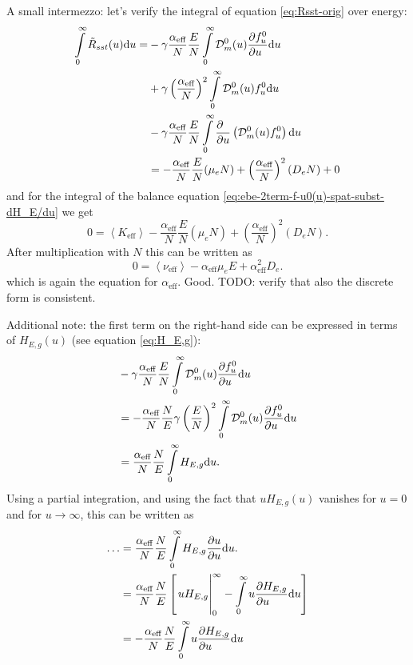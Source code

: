 \documentclass{book}
\newcommand{\MEAN}[1]{\ensuremath{\!\left\langle{{#1}}\right\rangle}}
\begin{document}
\begin{framed}
A small intermezzo: let's verify the integral of equation \eqref{eq:Rsst-orig} over energy:
\begin{align*}
	\int\limits_0^\infty \tilde{R}_{sst}(u)\dd{u}
	=
	& -\gamma\frac{\alpha_{\text{eff}}}{N}\frac{E}{N}\int\limits_0^\infty{\cal D}_m^0(u)\PDEV{f^0_u}{u}\dd{u} \\
	& +\gamma\left(\frac{\alpha_{\text{eff}}}{N}\right)^2\int\limits_0^\infty{\cal D}_m^0(u)f^0_u\dd{u} \\
	& -\gamma\frac{\alpha_{\text{eff}}}{N}\frac{E}{N}\int\limits_0^\infty\PDEV{}{u}\left({\cal D}_m^0(u)f^0_u\right)\dd{u} \\
	&= -\frac{\alpha_{\text{eff}}}{N}\frac{E}{N}(\mu_eN)
	   +\left(\frac{\alpha_{\text{eff}}}{N}\right)^2(D_eN)
	   + 0
\end{align*}
and for the integral of the balance equation \eqref{eq:ebe-2term-f-u0(u)-spat-subst-dH_E/du} we get
\begin{equation}
	0 = \MEAN{K_{\text{eff}}} -\frac{\alpha_{\text{eff}}}{N}\frac{E}{N}(\mu_eN) +\left(\frac{\alpha_{\text{eff}}}{N}\right)^2(D_eN).
\end{equation}
After multiplication with $N$ this can be written as
\begin{equation}
	0 = \MEAN{\nu_{\text{eff}}} -\alpha_{\text{eff}}\mu_eE +\alpha_{\text{eff}}^2D_e.
\end{equation}
which is again the equation for $\alpha_{\text{eff}}$. Good.
TODO: verify that also the discrete form is consistent.

Additional note: the first term on the right-hand side can be expressed in terms of
$H_{E,g}(u)$ (see equation \eqref{eq:H_E,g}):
\begin{align}
	&  -\gamma\frac{\alpha_{\text{eff}}}{N}\frac{E}{N}\int\limits_0^\infty{\cal D}_m^0(u)\PDEV{f^0_u}{u}\dd{u}
	\nonumber \\
	&= -\frac{\alpha_{\text{eff}}}{N}\frac{N}{E}\gamma\left(\frac{E}{N}\right)^2\int\limits_0^\infty{\cal D}_m^0(u)\PDEV{f^0_u}{u}\dd{u}
	\nonumber \\
	&= \frac{\alpha_{\text{eff}}}{N}\frac{N}{E}\int\limits_0^\infty H_{E,g}\dd{u}.
\end{align}
Using a partial integration, and using the fact that $uH_{E,g}(u)$ vanishes for $u=0$ and for $u\rightarrow\infty$,
this can be written as
\begin{align}
	\ldots
	&= \frac{\alpha_{\text{eff}}}{N}\frac{N}{E}\int\limits_0^\infty H_{E,g}\PDEV{u}{u}\dd{u}.
	\nonumber \\
	&= \frac{\alpha_{\text{eff}}}{N}\frac{N}{E}\left[
		\left. \vphantom{\int\limits_0^\infty} u H_{E,g}\right|_0^\infty
		- \int\limits_0^\infty u\PDEV{H_{E,g}}{u}\dd{u}
	\right]
	\nonumber \\
	&= -\frac{\alpha_{\text{eff}}}{N}\frac{N}{E}
		\int\limits_0^\infty u\PDEV{H_{E,g}}{u}\dd{u}
\end{align}
\end{framed}
\end{document}
